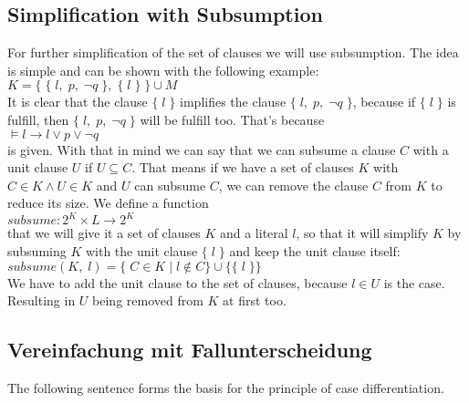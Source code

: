 \subsection{Simplification with Subsumption}
For further simplification of the set of clauses we will use subsumption. The idea is simple and can be shown with the following example:
\\
\hspace*{1.3cm}
$K = \{\; \{\; l,\; p,\; \neg q \;\},\; \{\; l\; \}\; \} \cup M$
\\[0.2cm]
It is clear that the clause $\{\; l\; \}$ implifies the clause $\{\; l,\; p,\; \neg q \;\}$, because if $\{\; l\; \}$ is fulfill, then $\{\; l,\; p,\; \neg q \;\}$ will be fulfill too. That's because
\\
\hspace*{1.3cm}
$\models l \to l \lor p \lor \neg q$
\\[0.2cm]
is given. With that in mind we can say that we can subsume a clause $C$ with a unit clause $U$ if $U \subseteq C$. That means if we have a set of clauses $K$ with $C \in K \land U \in K$ and $U$ can subsume $C$, we can remove the clause $C$ from $K$ to reduce its size. We define a function
\\
\hspace*{1.3cm}
$subsume: 2^{K} \times L \to 2^{K}$
\\[0.2cm]
that we will give it a set of clauses $K$ and a literal $l$, so that it will simplify $K$ by subsuming $K$ with the unit clause $\{\; l\; \}$ and keep the unit clause itself:
\\
\hspace*{1.3cm}
$subsume(K,\; l) = \{\; C \in K\; |\; l \notin C\} \cup \{\{\; l\; \}\}$
\\[0.2cm]
We have to add the unit clause to the set of clauses, because $l \in U$ is the case. Resulting in $U$ being removed from $K$ at first too. \cite{Stroetman2019}

\subsection{Vereinfachung mit Fallunterscheidung}
The following sentence forms the basis for the principle of case differentiation. %
